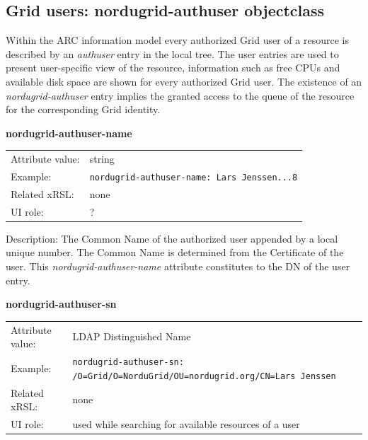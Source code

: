 \documentclass{article}
\begin{document}



\subsection{Grid users: nordugrid-authuser objectclass}

Within the ARC information model every authorized Grid user of a 
resource is described by an \emph{authuser} entry in the local tree.
The user entries are used to present user-specific view of
the resource, information such as free CPUs and available disk space 
are shown for every authorized Grid user.
The existence of an {\it nordugrid-authuser} entry implies the 
granted access to the queue of the resource for the corresponding Grid identity.


  \hspace*{0.5cm}
  \begin{shaded}
    \textbf{nordugrid-authuser-name}
  \end{shaded}
  \begin{tabular}{lp{10cm}}  
    Attribute value:& string\\
    Example:& \verb#nordugrid-authuser-name: Lars Jenssen...8#\\
    Related xRSL:& none\\
    UI role:& ?\\
  \end{tabular}

Description: 
The Common Name of the authorized user appended by a local unique number.
The Common Name is determined from the Certificate of the user.
This {\it nordugrid-authuser-name}  attribute constitutes to the DN of the user entry.


  \hspace*{0.5cm}
  \begin{shaded}
    \textbf{nordugrid-authuser-sn}
  \end{shaded}
  \begin{tabular}{lp{10cm}}  
    Attribute value:& LDAP Distinguished Name\\
    Example:& \verb#nordugrid-authuser-sn: /O=Grid/O=NorduGrid/OU=nordugrid.org/CN=Lars Jenssen#\\
    Related xRSL:& none\\
    UI role:& used while searching for available resources of a user\\ 
  \end{tabular}
\end{document}
